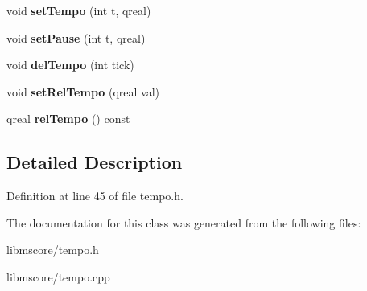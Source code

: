 \begin{DoxyCompactItemize}
void {\bfseries set\+Tempo} (int t, qreal)
\item 
\mbox{\label{class_ms_1_1_tempo_map_a40cbe16e53c38c59e42f37d1e8776112}} 
void {\bfseries set\+Pause} (int t, qreal)
\item 
\mbox{\label{class_ms_1_1_tempo_map_a9caacd5955a82aca259389fa3f5c3fa2}} 
void {\bfseries del\+Tempo} (int tick)
\item 
\mbox{\label{class_ms_1_1_tempo_map_af5cebddb58ab9a281dd185c07377b4cf}} 
void {\bfseries set\+Rel\+Tempo} (qreal val)
\item 
\mbox{\label{class_ms_1_1_tempo_map_a6a712b7fa2fa54777e1cff05885f799a}} 
qreal {\bfseries rel\+Tempo} () const
\end{DoxyCompactItemize}


\subsection{Detailed Description}


Definition at line 45 of file tempo.\+h.



The documentation for this class was generated from the following files\+:\begin{DoxyCompactItemize}
\item 
libmscore/tempo.\+h\item 
libmscore/tempo.\+cpp\end{DoxyCompactItemize}
